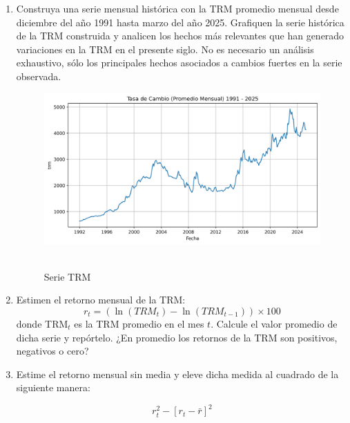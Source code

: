 \documentclass{article}
\theoremstyle{remark}
\theoremstyle{definition}
\begin{document}
\begin{enumerate}[label = \emph{\alph*})]
    \item {Construya una serie mensual hist\'orica con la TRM promedio mensual desde diciembre del año 1991 hasta marzo del año 2025. Grafiquen la serie hist\'orica de la TRM construida y analicen los hechos m\'as relevantes que han generado variaciones en la TRM en el presente siglo. No es necesario un an\'alisis exhaustivo, s\'olo los principales hechos asociados a cambios fuertes en la serie observada.}
        \begin{tcolorbox}[title=Soluci\'on 2.a]
            \begin{figure}[H]
                \centering
                \includegraphics[width=0.9\linewidth]{output/graf_trm.png}\
                \caption{Serie TRM}
                \label{fig:serie_trm}
            \end{figure}
        \end{tcolorbox}
    \item {Estimen el retorno mensual de la TRM:}
    \begin{equation}
        r_t = (\ln(TRM_t) - \ln(TRM_{t-1})) \times 100
    \end{equation}
    {donde TRM$_t$ es la TRM promedio en el mes $t$. Calcule el valor promedio de dicha serie y rep\'ortelo. ¿En promedio los retornos de la TRM son positivos, negativos o cero?}
        \begin{tcolorbox}[title=Soluci\'on 2.b]
        
            
            
        \end{tcolorbox}
    \item {Estime el retorno mensual sin media y eleve dicha medida al cuadrado de la siguiente manera: }

    \begin{equation}
        r_t^2-[r_t-\bar{r}]^2
    \end{equation}


\end{enumerate}
\end{document}
